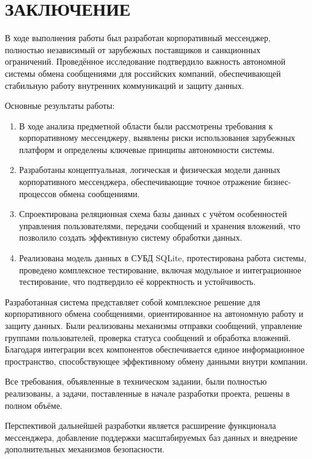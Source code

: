 \section*{ЗАКЛЮЧЕНИЕ}

В ходе выполнения работы был разработан корпоративный мессенджер, полностью независимый от зарубежных поставщиков и санкционных ограничений. Проведённое исследование подтвердило важность автономной системы обмена сообщениями для российских компаний, обеспечивающей стабильную работу внутренних коммуникаций и защиту данных.

Основные результаты работы:

\begin{enumerate}
	\item В ходе анализа предметной области были рассмотрены требования к корпоративному мессенджеру, выявлены риски использования зарубежных платформ и определены ключевые принципы автономности системы.
	\item Разработаны концептуальная, логическая и физическая модели данных корпоративного мессенджера, обеспечивающие точное отражение бизнес-процессов обмена сообщениями.
	\item Спроектирована реляционная схема базы данных с учётом особенностей управления пользователями, передачи сообщений и хранения вложений, что позволило создать эффективную систему обработки данных.
	\item Реализована модель данных в СУБД SQLite, протестирована работа системы, проведено комплексное тестирование, включая модульное и интеграционное тестирование, что подтвердило её корректность и устойчивость.
\end{enumerate}

Разработанная система представляет собой комплексное решение для корпоративного обмена сообщениями, ориентированное на автономную работу и защиту данных. Были реализованы механизмы отправки сообщений, управление группами пользователей, проверка статуса сообщений и обработка вложений. Благодаря интеграции всех компонентов обеспечивается единое информационное пространство, способствующее эффективному обмену данными внутри компании.

Все требования, объявленные в техническом задании, были полностью реализованы, а задачи, поставленные в начале разработки проекта, решены в полном объёме. 

Перспективой дальнейшей разработки является расширение функционала мессенджера, добавление поддержки масштабируемых баз данных и внедрение дополнительных механизмов безопасности.
